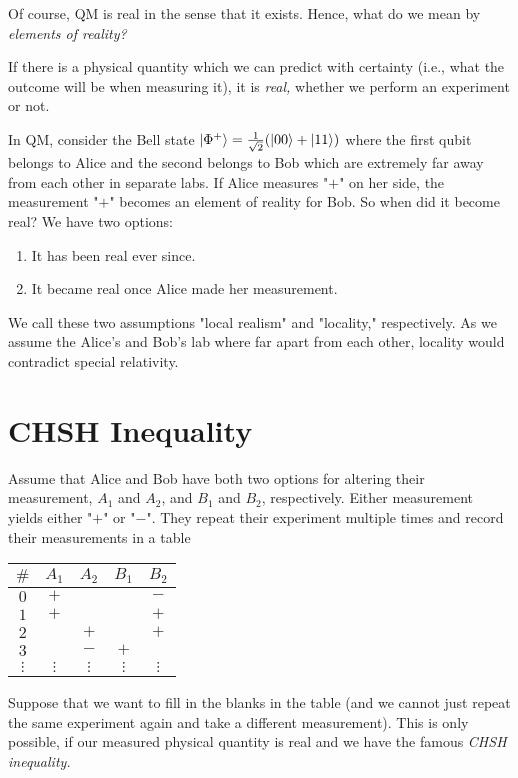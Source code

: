 	Of course, \ac{QM} is real in the sense that it exists. Hence, what do we mean by \emph{elements of reality?}
	\begin{definition}  \label{def:real}
		If there is a physical quantity which we can predict with certainty (i.e., what the outcome will be when measuring it), it is \emph{real,} whether we perform an experiment or not.
	\end{definition}
	In \ac{QM}, consider the Bell state \( \ket{\Phi^+} = \frac{1}{\sqrt{2}} (\ket{00} + \ket{11}) \) where the first qubit belongs to Alice and the second belongs to Bob which are extremely far away from each other in separate labs. If Alice measures "\(+\)" on her side, the measurement "\(+\)" becomes an element of reality for Bob. So when did it become real? We have two options:
	\begin{enumerate}
		\item It has been real ever since.
		\item It became real once Alice made her measurement.
	\end{enumerate}
	We call these two assumptions "local realism" and "locality," respectively. As we assume the Alice's and Bob's lab where far apart from each other, locality would contradict special relativity.

	\section{CHSH Inequality}
		Assume that Alice and Bob have both two options for altering their measurement, \(A_1\) and \(A_2\), and \(B_1\) and \(B_2\), respectively. Either measurement yields either "\(+\)" or "\(-\)". They repeat their experiment multiple times and record their measurements in a table
		\begin{center}
			\begin{tabular}{c|cc|cc}
				\(\#\)     & \(A_1\)    & \(A_2\)    & \(B_1\)    & \(B_2\)    \\ \midrule
				\(0\)      & \(+\)      &            &            & \(-\)      \\
				\(1\)      & \(+\)      &            &            & \(+\)      \\
				\(2\)      &            & \(+\)      &            & \(+\)      \\
				\(3\)      &            & \(-\)      & \(+\)      &            \\
				\(\vdots\) & \(\vdots\) & \(\vdots\) & \(\vdots\) & \(\vdots\)
			\end{tabular}
		\end{center}
		Suppose that we want to fill in the blanks in the table (and we cannot just repeat the same experiment again and take a different measurement). This is only possible, if our measured physical quantity is real and we have the famous \emph{CHSH inequality.}

